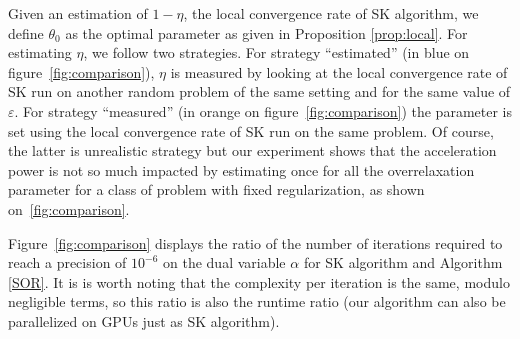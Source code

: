 \documentclass{article} %
\DeclareMathOperator{\IR}{\mathbb{R}}
\DeclareMathOperator{\Ccal}{\mathcal{C}}
\DeclareMathOperator{\diag}{diag}
\renewcommand{\epsilon}{\varepsilon}
\theoremstyle{plain}
\theoremstyle{definition}
\theoremstyle{remark}
\begin{document}
Given an estimation of $1-\eta$, the local convergence rate of SK algorithm, we define $\theta_0$ as the optimal parameter as given in Proposition \ref{prop:local}. For estimating $\eta$, we follow two strategies. For strategy ``estimated'' (in blue on figure~\ref{fig:comparison}), $\eta$ is measured by looking at the local convergence rate of SK run on another random problem of the same setting and for the same value of $\epsilon$. For strategy ``measured'' (in orange on figure~\ref{fig:comparison}) the parameter is set using the local convergence rate of SK run on the same problem. Of course, the latter is unrealistic strategy but our experiment shows that the acceleration power is not so much impacted by estimating once for all the overrelaxation parameter for a class of problem with fixed regularization, as shown on~\ref{fig:comparison}.

Figure~\ref{fig:comparison} displays the ratio of the number of iterations required to reach a precision of $10^{-6}$ on the dual variable $\alpha$ for SK algorithm and Algorithm \ref{SOR}. It is is worth noting that the complexity per iteration is the same, modulo negligible terms, so this ratio is also the runtime ratio (our algorithm can also be parallelized on GPUs just as SK algorithm).


\renewcommand{\algorithmiccomment}[1]{\hfill\bgroup(#1)\egroup}
\end{document}
